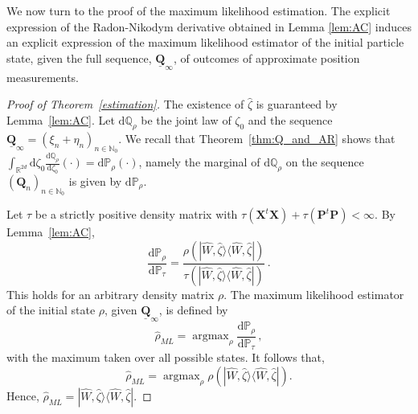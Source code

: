 \documentclass[12pt]{article}
\newcommand{\ket}[1]{|{#1}\rangle}
\newcommand{\bra}[1]{\langle{#1}|}
\renewcommand{\d}{{\mathrm d}}
\begin{document}
We now turn to the proof of the maximum likelihood estimation. The explicit expression of the Radon-Nikodym derivative obtained in Lemma \ref{lem:AC} induces an explicit expression of the maximum likelihood estimator of the initial particle state, given the full sequence, $\underline{\mathbf Q}_\infty$, of outcomes of approximate position measurements.
\begin{proof}[Proof of Theorem~\ref{estimation}]
	The existence of $\widehat \zeta$ is guaranteed by Lemma~\ref{lem:AC}. Let $\d\mathbb Q_\rho$ be the joint law of $\zeta_0$ and the sequence $\underline{\mathbf Q}_\infty=(\xi_n+ \eta_n)_{n\in\mathbb N_0}$.
	We recall that Theorem~\ref{thm:Q_and_AR} shows that $\int_{\mathbb R^{2d}}\d\zeta_0 \frac{\d\mathbb Q_\rho}{\d\zeta_0}(\cdot) =\d\mathbb P_\rho(\cdot)$, namely the marginal of $\d\mathbb Q_\rho$ on the sequence 
	$(\mathbf Q_n)_{n\in\mathbb N_0}$ is given by $\d\mathbb P_\rho$.
	
	Let $\tau$ be a strictly positive density matrix with 
	\mbox{$\tau(\mathbf X^t\mathbf X)+\tau(\mathbf P^t\mathbf P)<\infty$.}
	By Lemma~\ref{lem:AC},
	$$\frac{\d\mathbb P_\rho}{\d\mathbb P_\tau}=\frac{\rho(\ket{\widehat W,\widehat \zeta}\bra{\widehat W,\widehat \zeta})} {\tau(\ket{\widehat W,\widehat \zeta}\bra{\widehat W,\widehat \zeta})}\,.$$
	This holds for an arbitrary density matrix $\rho$. The maximum likelihood estimator of the initial state $\rho$, 
	given $\underline{\mathbf Q}_\infty$, is defined by
	$$\widehat \rho_{ML}=\operatorname{argmax}_{\rho} \frac{\d\mathbb P_\rho}{\d\mathbb P_\tau}\,,$$
	with the maximum taken over all possible states. It follows that,
	$$\widehat \rho_{ML}= \operatorname{argmax}_{\rho} \rho(\ket{\widehat W,\widehat \zeta}\bra{\widehat W,\widehat \zeta}).$$
	Hence, $\widehat \rho_{ML}=\ket{\widehat W,\widehat \zeta}\bra{\widehat W,\widehat \zeta}$. 
\end{proof}
\end{document}
